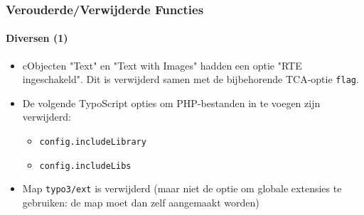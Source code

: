 \begin{frame}[fragile]
	\frametitle{Verouderde/Verwijderde Functies}
	\framesubtitle{Diversen (1)}

	\begin{itemize}

		\item cObjecten "Text" en "Text with Images" hadden een optie "RTE ingeschakeld".
			Dit is verwijderd samen met de bijbehorende TCA-optie \texttt{flag}.

		\item De volgende TypoScript opties om PHP-bestanden in te voegen zijn verwijderd:

			\begin{itemize}
				\item \texttt{config.includeLibrary}
				\item \texttt{config.includeLibs}
			\end{itemize}

		\item Map \texttt{typo3/ext} is verwijderd\newline
			\small
				(maar niet de optie om globale extensies te gebruiken: de map moet dan zelf aangemaakt worden)
			\normalsize

	\end{itemize}

\end{frame}


